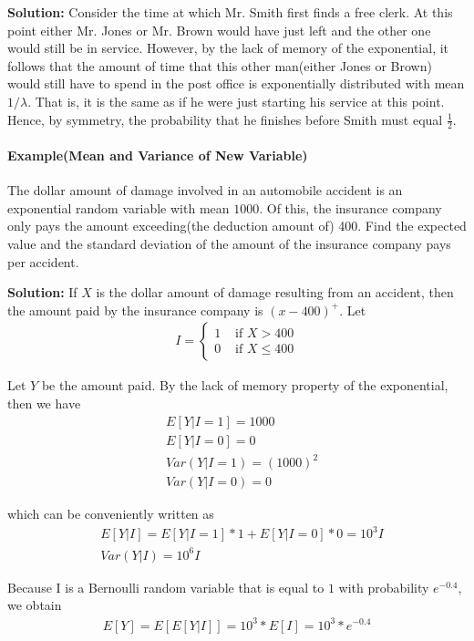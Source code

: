 \documentclass[10 pt,final]{article}
\newcommand{\impo}[1]{{\color{magenta} #1}}
\begin{document}
\textbf{Solution:} Consider the time at which Mr. Smith first finds a free clerk. At this point either Mr. Jones or Mr. Brown would have just left and the other one would still be in service. \impo{However, by the lack of memory of the exponential, it follows that the amount of time that this other man(either Jones or Brown)} would still have to spend in the post office is exponentially distributed with mean $1/\lambda$. That is, \impo{it is the same as if he were just starting his service at this point}. Hence, by symmetry, the probability that he finishes before Smith must equal $\frac{1}{2}$.

\paragraph{Example(Mean and Variance of New Variable)} The dollar amount of damage involved in an automobile accident is an exponential random variable with mean $1000$. Of this, the insurance company only pays the amount exceeding(the deduction amount of) 400. Find the expected value and the standard deviation of the amount of the insurance company pays per accident.

\textbf{Solution:} If $X$ is the dollar amount of damage resulting from an accident, then the amount paid by the insurance company is $(x-400)^+$. Let
\begin{align*}
I =
\begin{cases}
1 & \mbox{ if $X> 400$} \\
0 & \mbox{ if $X \leq 400$}
\end{cases}
\end{align*}

Let $Y$ be the amount paid. By the lack of memory property of the exponential, then we have
\begin{align*}
& E[Y|I=1] = 1000 \\
& E[Y|I=0] = 0 \\
& Var(Y|I=1) = (1000)^2 \\
& Var(Y|I=0) = 0
\end{align*}

which can be conveniently written as
\impo{
\begin{align*}
& E[Y|I] = E[Y|I=1]*1 + E[Y|I=0]*0 = 10^3 I \\ 
& Var(Y|I) = 10^6 I
\end{align*}
}

Because I is a Bernoulli random variable that is equal to $1$ with probability \impo{$e^{-0.4}$}, we obtain
\begin{align*}
E[Y] = E[E[Y|I]] = 10^3*E[I] = 10^3*e^{-0.4}
\end{align*}
\end{document}
